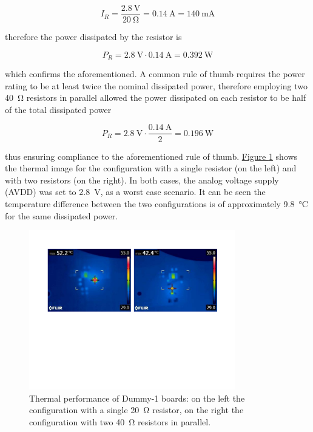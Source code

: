 \begin{equation}
    I_{R} = \frac{\SI{2.8}{\volt}}{\SI{20}{\ohm}} = \SI{0.14}{\ampere} = \SI{140}{\milli\ampere} 
\end{equation}

\noindent
therefore the power dissipated by the resistor is

\begin{equation}
    P_{R} = \SI{2.8}{\volt} \cdot \SI{0.14}{\ampere} = \SI{0.392}{\watt} 
\end{equation}

\noindent
which confirms the aforementioned. A common rule of thumb requires the power rating to be at least twice the nominal dissipated power, therefore employing two \SI{40}{\ohm} resistors in parallel allowed the power dissipated on each resistor to be half of the total dissipated power

\begin{equation}
    P_{R} = \SI{2.8}{\volt} \cdot \frac{\SI{0.14}{\ampere}}{2} = \SI{0.196}{\watt}
\end{equation}

\noindent
thus ensuring compliance to the aforementioned rule of thumb. \hyperref[figDummyThermal]{Figure \ref{figDummyThermal}} shows the thermal image for the configuration with a single resistor (on the left) and with two resistors (on the right). In both cases, the analog voltage supply (AVDD) was set to \SI{2.8}{\volt}, as a worst case scenario. It can be seen the temperature difference between the two configurations is of approximately \SI{9.8}{\celsius} for the same dissipated power.

\begin{figure}[h!]
    \centering
    \includegraphics[width=0.8\textwidth]{Images/chap2/DUMMY_bef_aft.pdf}
    \caption{Thermal performance of Dummy-1 boards: on the left the configuration with a single \SI{20}{\ohm} resistor, on the right the configuration with two \SI{40}{\ohm} resistors in parallel.}
    \label{figDummyThermal}
\end{figure}

